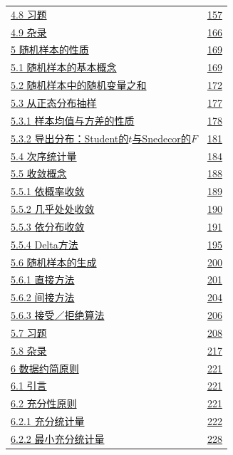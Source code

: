 \begin{longtable}{@{}p{}r@{}}
\hyperref[sec:4.8]{4.8 习题} & \hyperref[sec:4.8]{157} \\
\hyperref[sec:4.9]{4.9 杂录} & \hyperref[sec:4.9]{166} \\
\hyperref[sec:5]{5 随机样本的性质} & \hyperref[sec:5]{169} \\
\hyperref[sec:5.1]{5.1 随机样本的基本概念} & \hyperref[sec:5.1]{169} \\
\hyperref[sec:5.2]{5.2 随机样本中的随机变量之和} & \hyperref[sec:5.2]{172} \\
\hyperref[sec:5.3]{5.3 从正态分布抽样} & \hyperref[sec:5.3]{177} \\
\hyperref[sec:5.3.1]{5.3.1 样本均值与方差的性质} & \hyperref[sec:5.3.1]{178} \\
\hyperref[sec:5.3.2]{5.3.2 导出分布：Student的$t$与Snedecor的$F$} & \hyperref[sec:5.3.2]{181} \\
\hyperref[sec:5.4]{5.4 次序统计量} & \hyperref[sec:5.4]{184} \\
\hyperref[sec:5.5]{5.5 收敛概念} & \hyperref[sec:5.5]{188} \\
\hyperref[sec:5.5.1]{5.5.1 依概率收敛} & \hyperref[sec:5.5.1]{189} \\
\hyperref[sec:5.5.2]{5.5.2 几乎处处收敛} & \hyperref[sec:5.5.2]{190} \\
\hyperref[sec:5.5.3]{5.5.3 依分布收敛} & \hyperref[sec:5.5.3]{191} \\
\hyperref[sec:5.5.4]{5.5.4 Delta方法} & \hyperref[sec:5.5.4]{195} \\
\hyperref[sec:5.6]{5.6 随机样本的生成} & \hyperref[sec:5.6]{200} \\
\hyperref[sec:5.6.1]{5.6.1 直接方法} & \hyperref[sec:5.6.1]{201} \\
\hyperref[sec:5.6.2]{5.6.2 间接方法} & \hyperref[sec:5.6.2]{204} \\
\hyperref[sec:5.6.3]{5.6.3 接受／拒绝算法} & \hyperref[sec:5.6.3]{206} \\
\hyperref[sec:5.7]{5.7 习题} & \hyperref[sec:5.7]{208} \\
\hyperref[sec:5.8]{5.8 杂录} & \hyperref[sec:5.8]{217} \\
\hyperref[sec:6]{6 数据约简原则} & \hyperref[sec:6]{221} \\
\hyperref[sec:6.1]{6.1 引言} & \hyperref[sec:6.1]{221} \\
\hyperref[sec:6.2]{6.2 充分性原则} & \hyperref[sec:6.2]{221} \\
\hyperref[sec:6.2.1]{6.2.1 充分统计量} & \hyperref[sec:6.2.1]{222} \\
\hyperref[sec:6.2.2]{6.2.2 最小充分统计量} & \hyperref[sec:6.2.2]{228} \\

\end{longtable}
